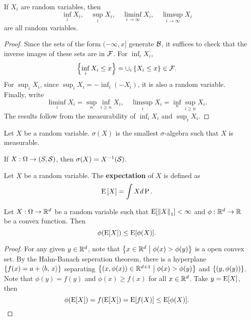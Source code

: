 \begin{corollary}
    If $X_i$ are random variables, then 
    \begin{equation*}
        \inf_i X_i,\quad \sup_i X_i,\quad \liminf_{i\to\infty} X_i,\quad \limsup_{i\to\infty} X_i
    \end{equation*} 
    are all random variables.
\end{corollary}
\begin{proof}
    Since the sets of the form $(-\infty, x]$ generate $\B$, it suffices to check 
    that the inverse images of these sets are in $\F$. For $\inf_i X_i$, 
    \begin{equation*}
        \set{\inf_i X_i \leq x} = \cup_i \set{X_i \leq x}\in\F.
    \end{equation*} 
    For $\sup_i X_i$, since $\sup_i X_i = -\inf_i (-X_i)$, it is also a random 
    variable. Finally, write 
    \begin{equation*}
        \liminf_i X_i = \sup_n \inf_{i\geq n} X_i,\quad \limsup_i X_i = \inf_n \sup_{i\geq n} X_i.
    \end{equation*}
    The results follow from the measurability of $\inf_i X_i$ and $\sup_i X_i$. 
\end{proof}

\begin{definition}
    Let $X$ be a random variable. $\sigma(X)$ is the smallest $\sigma$-algebra 
    such that $X$ is measurable. 
\end{definition}
\begin{remark}
    If $X:\Omega\to (S,\S)$, then $\sigma(X) = X^{-1}(\S)$. 
\end{remark}

\begin{definition}
    Let $X$ be a random variable. The \textbf{expectation} of $X$ is defined as 
    \begin{equation*}
        \E\sbrc{X} = \int Xd\P.
    \end{equation*}
\end{definition}

\begin{theorem}
    Let $X:\Omega\to\R^d$ be a random variable such that $\E[\norm{X}_1]<\infty$ 
    and $\phi:\R^d\to\R$ be a convex function. Then 
    \begin{equation*}
        \phi(\E[X]) \leq \E[\phi(X)].
    \end{equation*}
\end{theorem}
\begin{proof}
    For any given $y\in\R^d$, note that $\Set{x\in\R^d}{\phi(x)> \phi(y)}$ is
    a open convex set. By the Hahn-Banach seperation theorem, there is a hyperplane
    $\set{f(x) = a + \inp{b}{x}}$ separating $\Set{(x,\phi(x))\in\R^{d+1}}{\phi(x)> \phi(y)}$ and 
    $\set{(y,\phi(y))}$. Note that $\phi(y) = f(y)$ and $\phi(x)\geq f(x)$ for all 
    $x\in\R^d$. Take $y = \E[X]$, then 
    \begin{equation*}
        \phi(\E[X]) = f(\E[X]) = \E[f(X)] \leq \E[\phi(X)].
    \end{equation*}
\end{proof}

